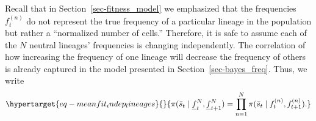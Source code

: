 \documentclass[
]{scrartcl}
\begin{document}
\begin{refsegment}
Recall that in Section~\ref{sec-fitness_model} we emphasized that the
frequencies \(f_t^{(n)}\) do not represent the true frequency of a
particular lineage in the population but rather a ``normalized number of
cells.'' Therefore, it is safe to assume each of the \(N\) neutral
lineages' frequencies is changing independently. The correlation of how
increasing the frequency of one lineage will decrease the frequency of
others is already captured in the model presented in
Section~\ref{sec-bayes_freq}. Thus, we write
\begin{equation}\protect\hypertarget{eq-meanfit_indep_lineages}{}{
\pi(\bar{s}_t \mid \underline{f}_t^N, \underline{f}_{t+1}^N) =
\prod_{n=1}^N \pi(\bar{s}_t \mid f_t^{(n)}, f_{t+1}^{(n)}).
}\label{eq-meanfit_indep_lineages}\end{equation}


\end{refsegment}
\end{document}
